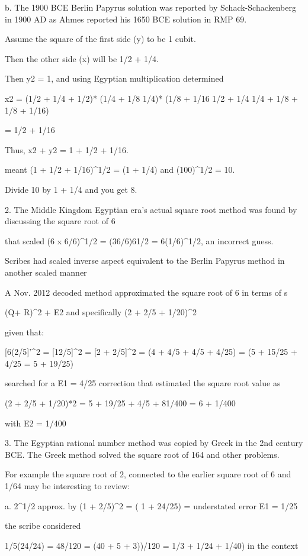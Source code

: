 \documentclass[12pt]{article}
\begin{document}
{b. The 1900 BCE Berlin Papyrus solution was reported by Schack-Schackenberg in 1900 AD as Ahmes reported his 1650 BCE solution in RMP 69. 

Assume the square of the first side (y) to be 1 cubit. 

Then the other side (x) will be 1/2 + 1/4. 

Then y2 = 1, and using Egyptian multiplication determined 

x2 = (1/2 + 1/4 + 1/2)* (1/4 + 1/8 1/4)* (1/8 + 1/16 1/2 + 1/4 1/4 + 1/8 + 1/8 + 1/16) 

= 1/2 + 1/16
 
Thus, x2 + y2 = 1 + 1/2 + 1/16. 

meant (1 + 1/2 + 1/16)^1/2 = (1 + 1/4) and (100)^1/2 = 10. 

Divide 10 by 1 + 1/4 and you get 8.

2. The Middle Kingdom Egyptian era's actual square root method was found by discussing the square root of 6

that scaled (6 x 6/6)^1/2 = (36/6)61/2 = 6(1/6)^1/2, an incorrect guess.

Scribes had scaled inverse aspect equivalent to the Berlin Papyrus method in another scaled manner


A Nov. 2012 decoded method approximated the square root of 6 in terms of s

(Q+ R)^2 + E2  and specifically (2 + 2/5 + 1/20)^2

given that:

[6(2/5]'^2 = [12/5]^2 = [2 + 2/5]^2 = (4 + 4/5 + 4/5 + 4/25) = (5 + 15/25 + 4/25 = 5 + 19/25)

searched for a E1 = 4/25 correction that estimated the square root value as

(2 + 2/5 + 1/20)*2  = {5 + 19/25  + 4/5 +  81/400 = 6 + 1/400}  

with E2 = 1/400

3. The Egyptian rational number method was copied by Greek in the 2nd century BCE. The Greek method solved the square root of 164 and other problems.  

For example the square root of 2, connected to the earlier square root of 6 and 1/64 may be interesting to review:

a. 2^1/2 approx. by (1 + 2/5)^2 = ( 1 + 24/25)  = understated error E1 = 1/25 

the scribe considered

1/5(24/24) = 48/120 = (40 + 5 + 3))/120 = 1/3 + 1/24 + 1/40) in the context

}
\end{document}
